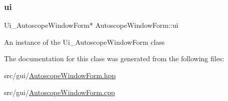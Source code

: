 \subsubsection{\texorpdfstring{ui}{ui}}
{\footnotesize\ttfamily Ui\+\_\+\+Autoscope\+Window\+Form$\ast$ Autoscope\+Window\+Form\+::ui\hspace{0.3cm}{\ttfamily [private]}}

An instance of the Ui\+\_\+\+Autoscope\+Window\+Form class 

The documentation for this class was generated from the following files\+:\begin{DoxyCompactItemize}
\item 
src/gui/\mbox{\hyperlink{_autoscope_window_form_8hpp}{Autoscope\+Window\+Form.\+hpp}}\item 
src/gui/\mbox{\hyperlink{_autoscope_window_form_8cpp}{Autoscope\+Window\+Form.\+cpp}}\end{DoxyCompactItemize}
